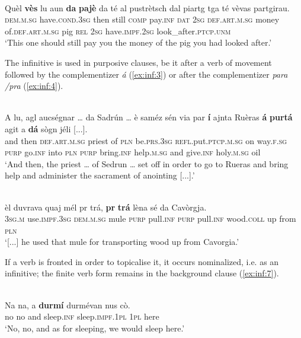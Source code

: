 \ea\label{ex:inf:2}
\\
\gll    Quèl \textbf{vès} lu aun \textbf{da} \textbf{pajè} da té al pustrètsch dal piartg tga té vèvas partgirau.\\
\textsc{dem.m.sg} have.\textsc{cond.3sg} then still \textsc{comp} pay.\textsc{inf} \textsc{dat} \textsc{2sg} \textsc{def.art.m.sg} money of.\textsc{def.art.m.sg} pig \textsc{rel} \textsc{2sg} have.\textsc{impf.2sg} look\_after.\textsc{ptcp.unm}\\
\glt `This one should still pay you the money of the pig you had looked after.'
\z

The infinitive is used in purposive clauses, be it after a verb of movement followed by the complementizer \textit{á} (\ref{ex:inf:3}) or after the complementizer \textit{para /pra} (\ref{ex:inf:4}).

\ea\label{ex:inf:3}
\\
\gll    A lu, agl aucségnar … da Sadrún … è saméz sén via par \textbf{í} ajnta Ruèras \textbf{á} \textbf{purtá} agit a \textbf{dá} sògn jéli [...].\\
and then \textsc{def.art.m.sg} priest {} of \textsc{pln} {} be.\textsc{prs.3sg} \textsc{refl.}put.\textsc{ptcp.m.sg} on way.\textsc{f.sg} \textsc{purp} go.\textsc{inf} into \textsc{pln}  \textsc{purp} bring.\textsc{inf} help.\textsc{m.sg} and give.\textsc{inf} holy.\textsc{m.sg} oil\\
\glt `And then, the priest … of Sedrun … set off in order to go to Rueras and bring help and administer the sacrament of anointing [...].'
\z

\ea\label{ex:inf:4}
\\
\gll [...] èl duvrava quaj mél pr trá, \textbf{pr} \textbf{trá} lèna sé da Cavòrgja.\\
{} \textsc{3sg.m} use.\textsc{impf.3sg} \textsc{dem.m.sg} mule \textsc{purp} pull.\textsc{inf} \textsc{purp} pull.\textsc{inf} wood.\textsc{coll} up from \textsc{pln}  \\
\glt `[...] he used that mule for transporting wood up from Cavorgia.'
\z

If a verb is fronted in order to topicalise it, it occurs nominalized, i.e. as an infinitive; the finite verb form remains in the background clause (\ref{ex:inf:7}).

\ea\label{ex:inf:7}
\\
\gll Na na, a \textbf{durmí} durmévan nus cò. \\
no no and sleep.\textsc{inf} sleep.\textsc{impf.1pl} \textsc{1pl} here\\
\glt `No, no, and as for sleeping, we would sleep here.'
\z

